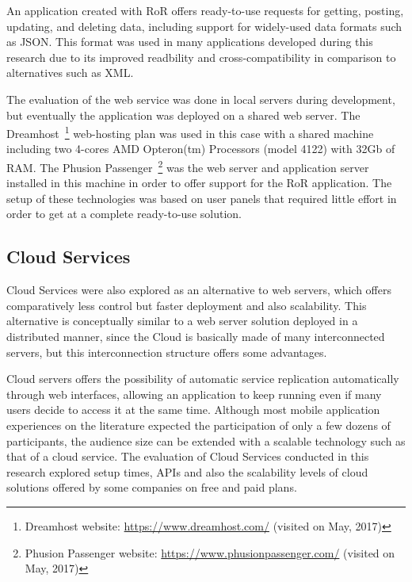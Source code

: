 An application created with RoR offers ready-to-use requests for getting, posting, updating, and deleting data, including support for widely-used data formats such as JSON.
This format was used in many applications developed during this research due to its improved readbility and cross-compatibility in comparison to alternatives such as XML.

The evaluation of the web service was done in local servers during development, but eventually the application was deployed on a shared web server.
The Dreamhost~\footnote{Dreamhost website: \url{https://www.dreamhost.com/} (visited on May, 2017)} web-hosting plan was used in this case with a shared machine including two 4-cores AMD Opteron(tm) Processors (model 4122) with 32Gb of RAM. 
The Phusion Passenger~\footnote{Phusion Passenger website: \url{https://www.phusionpassenger.com/} (visited on May, 2017)} was the web server and application server installed in this machine in order to offer support for the RoR application.
The setup of these technologies was based on user panels that required little effort in order to get at a complete ready-to-use solution.

\subsection*{Cloud Services}

Cloud Services were also explored as an alternative to web servers, which offers comparatively less control but faster deployment and also scalability.
This alternative is conceptually similar to a web server solution deployed in a distributed manner, since the Cloud is basically made of many interconnected servers, but this interconnection structure offers some advantages. 

Cloud servers offers the possibility of automatic service replication automatically through web interfaces, allowing an application to keep running even if many users decide to access it at the same time.
Although most mobile application experiences on the literature expected the participation of only a few dozens of participants, the audience size can be extended with a scalable technology such as that of a cloud service.
The evaluation of Cloud Services conducted in this research explored setup times, APIs and also the scalability levels of cloud solutions offered by some companies on free and paid plans. 

